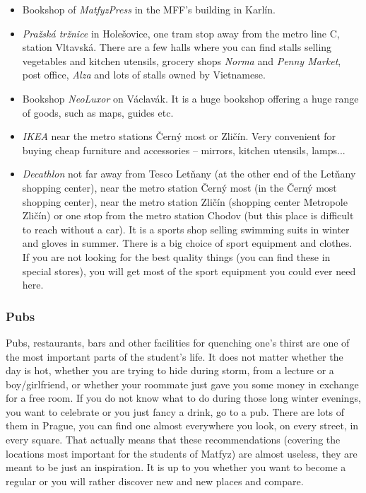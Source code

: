 \begin{itemize}
\item Bookshop of \textit{MatfyzPress} in the MFF's building in Karlín.
\item \textit{Pražská tržnice} in Holešovice, one tram stop away from the metro
line C, station Vltavská. There are a few halls where you can find stalls
selling vegetables and kitchen utensils, grocery shops \textit{Norma} and
\textit{Penny Market}, post office, \textit{Alza} and lots of stalls owned by
Vietnamese.
\item Bookshop \textit{ NeoLuxor} on Václavák. It is a huge bookshop offering a
huge range of goods, such as maps, guides etc.
\item \textit{IKEA} near the metro stations Černý most or Zličín. Very
convenient for buying cheap furniture and accessories -- mirrors, kitchen
utensils, lamps...
\item \textit{Decathlon} not far away from Tesco Letňany (at the other end of
the Letňany shopping center), near the metro station Černý most (in the Černý
most shopping center), near the metro station Zličín (shopping center Metropole
Zličín) or one stop from the metro station Chodov (but this place is difficult
to reach without a car).
It is a sports shop selling swimming suits in winter and gloves in summer. There
is a big choice of sport equipment and clothes.
If you are not looking for the best quality things (you can find these in
special stores), you will get most of the sport equipment you could ever need
here.
\end{itemize}


\subsubsection{Pubs}
Pubs, restaurants, bars and other facilities for quenching one's thirst are one
of the most important parts of the student's life.
It does not matter whether the day is hot, whether you are trying to hide during
storm, from a lecture or a boy/girlfriend, or whether your roommate just gave
you some money in exchange for a free room.
If you do not know what to do during those long winter evenings, you want to
celebrate or you just fancy a drink, go to a pub. There are lots of them in
Prague, you can find one almost everywhere you look, on every street, in every
square.
That actually means that these recommendations (covering the locations most
important for the students of Matfyz) are almost useless, they are meant to be
just an inspiration.
It is up to you whether you want to become a regular or you will rather discover
new and new places and compare.

